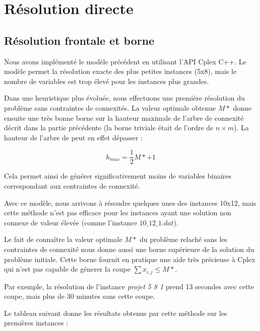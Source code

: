 \documentclass[12pt,a4paper]{article}
\begin{document}
\vspace{2cm}


\section{Résolution directe}

\subsection{Résolution frontale et borne}

Nous avons implémenté le modèle précédent en utilisant l'API Cplex C++. Le modèle permet la résolution exacte des plus petites instances (5x8), mais le nombre de variables est trop élevé pour les instances plus grandes.

Dans une heuristique plus évoluée, nous effectuons une première résolution du problème sans contraintes de connexités. La valeur optimale obtenue $M*$ donne ensuite une très bonne borne sur la hauteur maximale de l'arbre de connexité décrit dans la partie précédente (la borne triviale était de l'ordre de $n \times m$). La hauteur de l'arbre de peut en effet dépasser :

\[ h_{max} = \dfrac{1}{2} M* +1\]

 Cela permet ainsi de générer significativement moins de variables binaires correspondant aux contraintes de connexité.

Avec ce modèle, nous arrivons à résoudre quelques unes des instances 10x12, mais cette méthode n'est pas efficace pour les instances ayant une solution non connexe de valeur élevée (comme l'instance $10\_12\_1.dat$).

\vspace{0.5cm}

Le fait de connaître la valeur optimale $M*$ du problème relaché sans les contraintes de connexité nous donne aussi une borne supérieure de la solution du problème initiale. Cette borne fournit en pratique une aide très précieuse à Cplex qui n'est pas capable de génerer la coupe $\sum x_{i,j} \leq M* $.

Par exemple, la résolution de l'instance \textit{projet 5 8 1} prend 13 secondes avec cette coupe, mais plus de 30 minutes sans cette coupe.


Le tableau suivant donne les résultats obtenus par cette méthode sur les premières instances :
\end{document}
